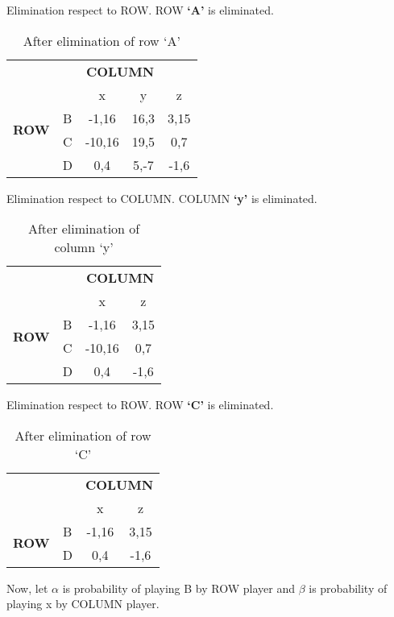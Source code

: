 \documentclass[a4paper,12pt]{article}
\begin{document}
\begin{enumerate}
Elimination respect to ROW. ROW \textbf{`A'} is eliminated.

\begin{table}[h]
\centering
\begin{tabular}{@{}ccccc@{}}
\toprule
\multicolumn{2}{c}{} & \multicolumn{2}{c}{\bfseries COLUMN}\\
\multicolumn{2}{c}{} & x & y & z\\
\multirow{2}{*}{\bfseries ROW} & B & -1,16 & 16,3 & 3,15\\
 & C & -10,16 & 19,5 & 0,7\\
 & D & 0,4 & 5,-7 & -1,6\\
 \bottomrule
\end{tabular}
\caption{After elimination of row `A'}
\end{table}

Elimination respect to COLUMN. COLUMN \textbf{`y'} is eliminated.

\begin{table}[H]
\centering
\begin{tabular}{@{}cccc@{}}
\toprule
\multicolumn{2}{c}{} & \multicolumn{2}{c}{\bfseries COLUMN}\\
\multicolumn{2}{c}{} & x & z\\
\multirow{2}{*}{\bfseries ROW} & B & -1,16 & 3,15\\
 & C & -10,16 & 0,7\\
 & D & 0,4 & -1,6\\
 \bottomrule
\end{tabular}
\caption{After elimination of column `y'}
\end{table}

Elimination respect to ROW. ROW \textbf{`C'} is eliminated.

\begin{table}[H]
\centering
\begin{tabular}{@{}cccc@{}}
\toprule
\multicolumn{2}{c}{} & \multicolumn{2}{c}{\bfseries COLUMN}\\
\multicolumn{2}{c}{} & x & z\\
\multirow{2}{*}{\bfseries ROW} & B & -1,16 & 3,15\\
 & D & 0,4 & -1,6\\
 \bottomrule
\end{tabular}
\caption{After elimination of row `C'}
\end{table}

Now, let $\alpha$ is probability of playing B by ROW player and $\beta$ is probability of playing x by COLUMN player.


\end{enumerate}
\end{document}
